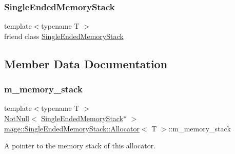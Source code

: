 \subsubsection{\texorpdfstring{Single\+Ended\+Memory\+Stack}{SingleEndedMemoryStack}}
{\footnotesize\ttfamily template$<$typename T $>$ \\
friend class \mbox{\hyperlink{classmage_1_1_single_ended_memory_stack}{Single\+Ended\+Memory\+Stack}}\hspace{0.3cm}{\ttfamily [friend]}}



\subsection{Member Data Documentation}
\mbox{\label{classmage_1_1_single_ended_memory_stack_1_1_allocator_a8728466cdbe936716f4326f298a6f186}} 
\subsubsection{\texorpdfstring{m\+\_\+memory\+\_\+stack}{m\_memory\_stack}}
{\footnotesize\ttfamily template$<$typename T $>$ \\
\mbox{\hyperlink{namespacemage_a8769f9d670d6b585ea306cb1062af94b}{Not\+Null}}$<$ \mbox{\hyperlink{classmage_1_1_single_ended_memory_stack}{Single\+Ended\+Memory\+Stack}}$\ast$ $>$ \mbox{\hyperlink{classmage_1_1_single_ended_memory_stack_1_1_allocator}{mage\+::\+Single\+Ended\+Memory\+Stack\+::\+Allocator}}$<$ T $>$\+::m\+\_\+memory\+\_\+stack\hspace{0.3cm}{\ttfamily [private]}}

A pointer to the memory stack of this allocator. 